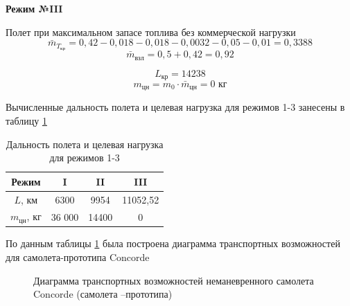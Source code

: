 \textbf{Режим №III}

Полет при максимальном запасе топлива без коммерческой нагрузки 
$$\bar{m}_{T_\text{кр}} = 0,42 - 0,018 - 0,018 - 0,0032 - 0,05 - 0,01 = 0,3388$$
$$\bar{m}_\text{взл} = 0,5 + 0,42 = 0,92$$

$$L_\text{кр} = 14238$$
$$m_\text{цн} = m_0 \cdot \bar{m}_\text{цн} = 0 \text{ кг}$$

Вычисленные дальность полета и целевая нагрузка для режимов 1-3 занесены в
таблицу \ref{tab:Дальность полета и целевая нагрузка для режимов 1-3} 

\begin{table}[H]
    \centering
    \caption{Дальность полета и целевая нагрузка для режимов 1-3}
    \begin{tabular}{|c|c|c|c|}
    \hline
        Режим & I & II & III  \\ \hline
        $L$, км & 6300 & 9954 & 11052,52 \\ \hline
        $m_\text{цн}$, кг & 36 000 & 14400 &0 \\ \hline
    \end{tabular}
    \label{tab:Дальность полета и целевая нагрузка для режимов 1-3}
\end{table}

По данным таблицы \ref{tab:Дальность полета и целевая нагрузка для режимов 1-3}  была построена диаграмма транспортных возможностей для самолета-прототипа Concorde

\begin{figure}[H]
    \caption{Диаграмма транспортных возможностей неманевренного самолета Concorde (самолета –прототипа)}
    \label{fig:Диаграмма транспортных возможностей неманевренного самолета Concorde (самолета –прототипа)}
\end{figure}

